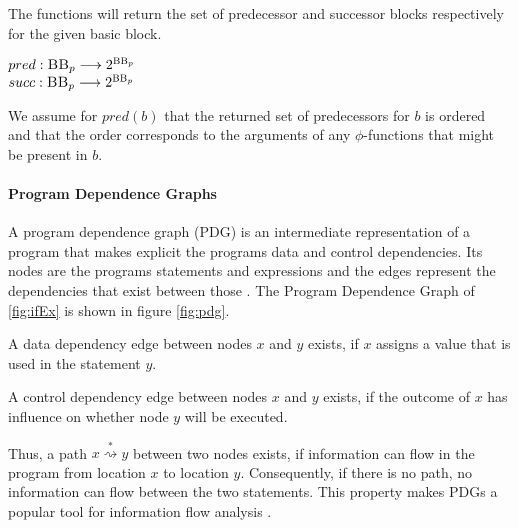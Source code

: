 \begin{definition}\label{def:succPred}
    The functions will return the set of predecessor and successor blocks respectively for the given basic block.
    \begin{center}
        $pred: \textsc{BB}_p \longrightarrow 2^{\textsc{BB}_p}$\\
        $succ: \textsc{BB}_p \longrightarrow 2^{\textsc{BB}_p}$
    \end{center}
    We assume for $pred(b)$ that the returned set of predecessors for $b$ is ordered and that the order corresponds to the arguments of any $\phi$-functions that might be present in $b$.
\end{definition}

\paragraph{Program Dependence Graphs}
A program dependence graph (PDG) is an intermediate representation of a program that makes explicit the programs data and control dependencies. Its nodes are the programs statements and expressions and the edges represent the dependencies that exist between those \cite{ferrante87}. The Program Dependence Graph of \ref{fig:ifEx} is shown in figure \ref{fig:pdg}.

A data dependency edge between nodes $x$ and $y$ exists, if $x$ assigns a value that is used in the statement $y$.

A control dependency edge between nodes $x$ and $y$ exists, if the outcome of $x$ has influence on whether node $y$ will be executed.

Thus, a path $x \stackrel{*}{\rightsquigarrow } y$ between two nodes exists, if information can flow in the program from location $x$ to location $y$. Consequently, if there is no path, no information can flow between the two statements. This property makes PDGs a popular tool for information flow analysis \cite{horwitz88,giffhorn12}.

